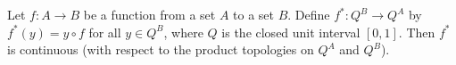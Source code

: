 Let $f: A \to B$ be a function from a set $A$ to a set $B$. Define $f^*: Q^B \to Q^A$ by $f^*(y) = y \circ f$ for all $y \in Q^B$, where $Q$ is the closed unit interval $[0,1]$. Then $f^*$ is continuous (with respect to the product topologies on $Q^A$ and $Q^B$).
